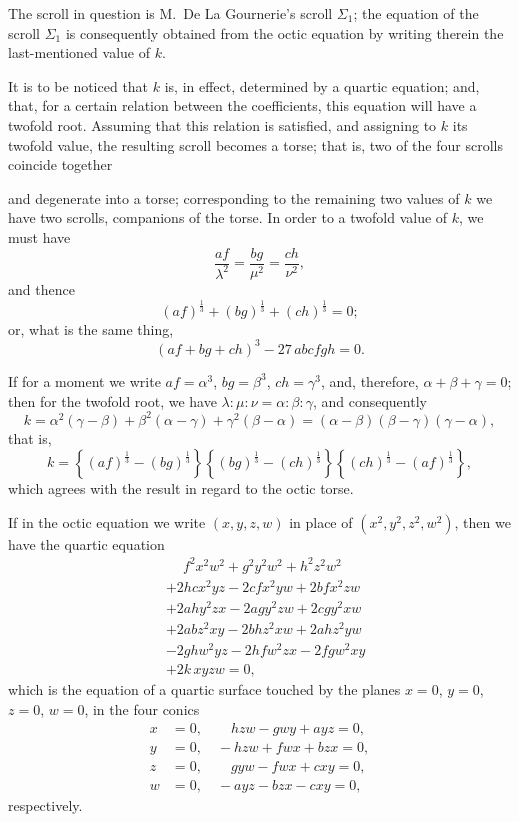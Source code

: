\documentclass[11pt,a4paper]{article}
\begin{document}
The scroll in question is M.~De La Gournerie's scroll $\Sigma_{1}$; the equation of the scroll $\Sigma_{1}$ is consequently obtained from the octic equation by writing therein the last-mentioned value of $k$.

It is to be noticed that $k$ is, in effect, determined by a quartic equation; and, that, for a certain relation between the coefficients, this equation will have a twofold root. Assuming that this relation is satisfied, and assigning to $k$ its twofold value, the resulting scroll becomes a torse; that is, two of the four scrolls coincide together

\newpage


and degenerate into a torse; corresponding to the remaining two values of $k$ we have two scrolls, companions of the torse. In order to a twofold value of $k$, we must have
\[
\frac{af}{\lambda^{2}} = \frac{bg}{\mu^{2}} = \frac{ch}{\nu^{2}},
\]
and thence
\[
(af)^{\tfrac{1}{3}} + (bg)^{\tfrac{1}{3}} + (ch)^{\tfrac{1}{3}} = 0;
\]
or, what is the same thing,
\[
(af + bg + ch)^{3} - 27\, abcfgh = 0.
\]

If for a moment we write $af = \alpha^{3}$, $bg = \beta^{3}$, $ch = \gamma^{3}$, and, therefore, $\alpha + \beta + \gamma = 0$; then for the twofold root, we have $\lambda : \mu : \nu = \alpha : \beta : \gamma$, and consequently
\[
k = \alpha^{2}(\gamma - \beta) + \beta^{2}(\alpha - \gamma) + \gamma^{2}(\beta - \alpha)
= (\alpha - \beta)(\beta - \gamma)(\gamma - \alpha),
\]
that is,
\[
k = \left\{ (af)^{\tfrac{1}{3}} - (bg)^{\tfrac{1}{3}} \right\} \left\{ (bg)^{\tfrac{1}{3}} - (ch)^{\tfrac{1}{3}} \right\} \left\{ (ch)^{\tfrac{1}{3}} - (af)^{\tfrac{1}{3}} \right\},
\]
which agrees with the result in regard to the octic torse.

If in the octic equation we write $(x, y, z, w)$ in place of $(x^{2}, y^{2}, z^{2}, w^{2})$, then we have the quartic equation
\[
\begin{aligned}
&\phantom{+}f^{2}x^{2}w^{2} + g^{2}y^{2}w^{2} + h^{2}z^{2}w^{2} \\
&+ 2hcx^{2}yz - 2cfx^{2}yw + 2bfx^{2}zw \\
&+ 2ahy^{2}zx - 2agy^{2}zw + 2cgy^{2}xw \\
&+ 2abz^{2}xy - 2bhz^{2}xw + 2ahz^{2}yw \\
&- 2ghw^{2}yz - 2hfw^{2}zx - 2fgw^{2}xy \\
&+ 2k\,xyzw = 0,
\end{aligned}
\]
which is the equation of a quartic surface touched by the planes $x = 0$, $y = 0$, $z = 0$, $w = 0$, in the four conics
\[
\begin{aligned}
x &= 0, \qquad hzw - gwy + ayz = 0, \\
y &= 0, \quad -hzw + fwx + bzx = 0, \\
z &= 0, \qquad gyw - fwx + cxy = 0, \\
w &= 0, \quad -ayz - bzx - cxy = 0,
\end{aligned}
\]
respectively.
\end{document}
